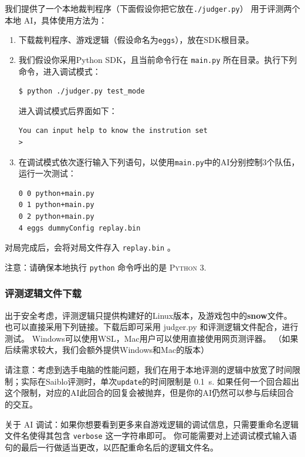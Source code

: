 \documentclass[UTF8]{article}
\begin{document}
我们提供了一个本地裁判程序（下面假设你把它放在\texttt{./judger.py}）
用于评测两个本地 AI，具体使用方法为：

\begin{enumerate}

\item 下载裁判程序、游戏逻辑（假设命名为\texttt{eggs}），放在SDK根目录。
\item 我们假设你采用Python SDK，且当前命令行在 \texttt{main.py} 所在目录。执行下列命令，进入调试模式：

\begin{lstlisting}[language=bash]
$ python ./judger.py test_mode
\end{lstlisting}
进入调试模式后界面如下：
\begin{lstlisting}
You can input help to know the instrution set
> 
\end{lstlisting}

\item 在调试模式依次逐行输入下列语句，以使用\texttt{main.py}中的AI分别控制3个队伍，运行一次测试：
\begin{lstlisting}
0 0 python+main.py
0 1 python+main.py
0 2 python+main.py
4 eggs dummyConfig replay.bin
\end{lstlisting}
\end{enumerate}

对局完成后，会将对局文件存入 \texttt{replay.bin} 。

注意：请确保本地执行 \texttt{python} 命令呼出的是 \textsc{Python 3}.

\hypertarget{header-n58}{%
\subsubsection{评测逻辑文件下载}\label{header-n58}}

出于安全考虑，评测逻辑只提供构建好的Linux版本，及游戏包中的\textbf{snow}文件。
也可以直接采用下列链接。下载后即可采用 judger.py 和评测逻辑文件配合，进行测试。
Windows可以使用WSL，Mac用户可以使用直接使用网页测评器。
（如果后续需求较大，我们会额外提供Windows和Mac的版本）

请注意：考虑到选手电脑的性能问题，我们在用于本地评测的逻辑中放宽了时间限制；实际在Saiblo评测时，单次\texttt{update}的时间限制是 \SI{0.1}{\second}. 
如果任何一个回合超出这个限制，对应的AI\color{red}此回合的回复会被抛弃\color{black}，但是你的AI\color{red}仍然可以参与后续回合的交互\color{black}。

关于 AI 调试：如果你想要看到更多来自游戏逻辑的调试信息，只需要重命名逻辑文件名使得其包含 \texttt{verbose} 这一字符串即可。
你可能需要对上述调试模式输入语句的最后一行做适当更改，以匹配重命名后的逻辑文件名。
\end{document}
